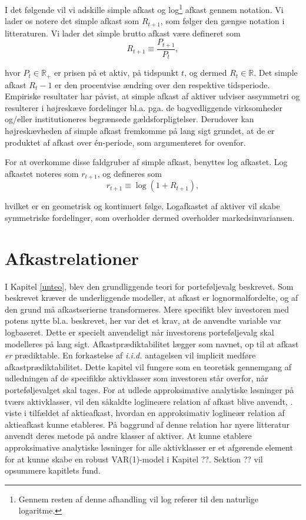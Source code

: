 \documentclass[
  a4paper,
  oneside]{memoir}
\begin{document}
I det følgende vil vi adskille simple afkast og log\footnote{Gennem resten af denne afhandling vil log referer til den naturlige logaritme.} afkast gennem notation. Vi lader os notere det simple afkast som \(R_{t+1}\), som følger den gængse notation i litteraturen. Vi lader det simple brutto afkast være defineret som
\[R_{t+1}\equiv\frac{P_{t+1}}{P_t},\]

hvor \(P_t\in\mathbb{R}_+\) er prisen på et aktiv, på tidspunkt \(t\), og dermed \(R_t\in\mathbb{R}\). Det simple afkast \(R_t-1\) er den procentvise ændring over den respektive tidsperiode. Empiriske resultater har påvist, at simple afkast af aktiver udviser assymmetri og resulterer i højreskæve fordelinger bl.a. pga. de bagvedliggende virksomheder og/eller institutioneres begrænsede gældsforpligtelser. Derudover kan højreskævheden af simple afkast fremkomme på lang sigt grundet, at de er produktet af afkast over én-periode, som argumenteret for ovenfor.

For at overkomme disse faldgruber af simple afkast, benyttes log afkastet. Log afkastet noteres som \(r_{t+1}\), og defineres som
\[r_{t+1}\equiv\log(1+R_{t+1}),\]

hvilket er en geometrisk og kontinuert følge. Logafkastet af aktiver vil skabe symmetriske fordelinger, som overholder dermed overholder markedsinvariansen.

\hypertarget{afkastrelationer}{%
\chapter{Afkastrelationer}\label{afkastrelationer}}

I Kapitel \ref{unteo}, blev den grundliggende teori for porteføljevalg beskrevet. Som beskrevet kræver de underliggende modeller, at afkast er lognormalfordelte, og af den grund må afkastserierne transformeres. Mere specifikt blev investoren med potens nytte bl.a. beskrevet, her var det et krav, at de anvendte variable var logbaseret. Dette er specielt anvendeligt når investorens porteføljevalg skal modelleres på lang sigt. Afkastprædiktabilitet lægger som navnet, op til at afkast \emph{er} prædiktable. En forkastelse af \emph{i.i.d.} antagelsen vil implicit medføre afkastprædiktabilitet. Dette kapitel vil fungere som en teoretisk gennemgang af udledningen af de specifikke aktivklasser som investoren står overfor, når porteføljevalget skal tages. For at udlede approksimative analytiske løsninger på tværs aktivklasser, vil den såkaldte loglineære relation af afkast blive anvendt, \citep{Campbell1988}. \citep{Campbell1988} viste i tilfældet af aktieafkast, hvordan en approksimativ loglineær relation af aktieafkast kunne etableres. På baggrund af denne relation har nyere litteratur anvendt deres metode på andre klasser af aktiver. At kunne etablere approksimative analytiske løsninger for alle aktivklasser er et afgørende element for at kunne skabe en robust VAR(1)-model i Kapitel ??. Sektion ?? vil opsummere kapitlets fund.
\end{document}

